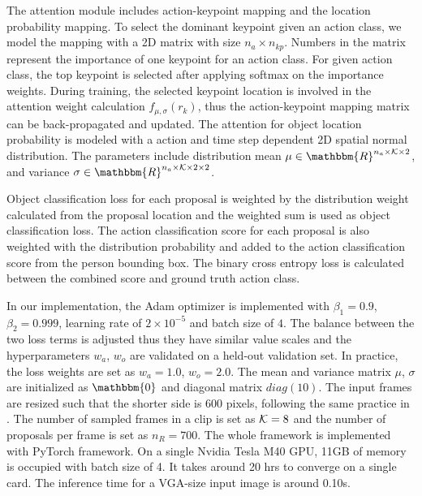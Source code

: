 The attention module includes action-keypoint mapping and the location probability mapping. To select the dominant keypoint given an action class, we model the mapping with a 2D matrix with size $n_a\times n_{kp}$. Numbers in the matrix represent the importance of one keypoint for an action class. For given action class, the top keypoint is selected after applying softmax on the importance weights. During training, the selected keypoint location is involved in the attention weight calculation $f_{\mu, \sigma}(r_k)$, thus the action-keypoint mapping matrix can be back-propagated and updated. The attention for object location probability is modeled with a action and time step dependent 2D spatial normal distribution. The parameters include distribution mean $\mu \in \mathbbm{R}^{n_a\times\scr{K}\times2}$, and variance $\sigma \in \mathbbm{R}^{n_a\times\scr{K}\times2\times2}$.

Object classification loss for each proposal is weighted by the distribution weight calculated from the proposal location and the weighted sum is used as object classification loss. The action classification score for each proposal is also weighted with the distribution probability and added to the action classification score from the person bounding box. The binary cross entropy loss is calculated between the combined score and ground truth action class.

In our implementation, the Adam optimizer \cite{kingma2014adam} is implemented with $\beta_1=0.9$, $\beta_2=0.999$, learning rate of $2\times 10^{-5}$ and batch size of $4$. The balance between the two loss terms is adjusted thus they have similar value scales and the hyperparameters $w_a$, $w_o$ are validated on a held-out validation set. In practice, the loss weights are set as $w_a=1.0$, $w_o=2.0$. The mean and variance matrix $\mu$, $\sigma$ are initialized as $\mathbbm{0}$ and diagonal matrix $diag(10)$. The input frames are resized such that the shorter side is 600 pixels, following the same practice in 
\cite{ren2015faster}. The number of sampled frames in a clip is set as ${\mathcal K}=8$ and the number of proposals per frame is set as $n_R=700$. The whole framework is implemented with PyTorch framework. On a single Nvidia Tesla M40 GPU, 11GB of memory is occupied with batch size of 4. It takes around 20 hrs to converge on a single card. The inference time for a VGA-size input image is around 0.10s.

